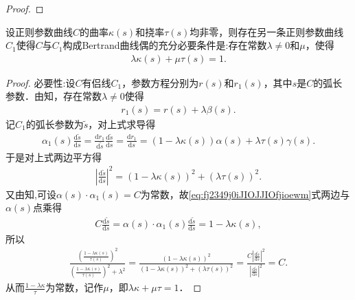 \documentclass[../../main.tex]{subfiles}%
\begin{document}
\begin{proof}
\end{proof}

\begin{theorem}\label{theorem:微分几何-定理7.2}
设正则参数曲线$C$的曲率$\kappa(s)$和挠率$\tau(s)$均非零，则存在另一条正则参数曲线$C_1$使得$C$与$C_1$构成Bertrand曲线偶的充分必要条件是:存在常数$\lambda\neq0$和$\mu$，使得
\begin{align*}
\lambda\kappa(s)+\mu\tau(s)=1.
\end{align*}
\end{theorem}
\begin{proof}

{\heiti 必要性:}设$C$有侣线$C_1$，参数方程分别为$r(s)$和$r_1(s)$，其中$s$是$C$的弧长参数．由知，存在常数$\lambda\neq0$使得
\begin{align*}
r_1(s)=r(s)+\lambda\beta(s).
\end{align*}
记$C_1$的弧长参数为$\tilde{s}$，对上式求导得
\begin{align}\label{eq:fj2349j0iJIOJJIOfjioewm}
\alpha _1\left( s \right) \frac{\mathrm{d}\tilde{s}}{\mathrm{d}s}=\frac{\mathrm{d}r_1}{\mathrm{d}\tilde{s}}\frac{\mathrm{d}\tilde{s}}{\mathrm{d}s}=\frac{\mathrm{d}r_1}{\mathrm{d}s}=\left( 1-\lambda \kappa \left( s \right) \right) \alpha \left( s \right) +\lambda \tau \left( s \right) \gamma \left( s \right) .
\end{align}
于是对上式两边平方得
\begin{align*}
\left| \frac{\mathrm{d}\tilde{s}}{\mathrm{d}s} \right|^2=\left( 1-\lambda \kappa \left( s \right) \right) ^2+\left( \lambda \tau \left( s \right) \right) ^2.
\end{align*}
又由知,可设$\alpha(s)\cdot\alpha_1(s)=C$为常数，故\eqref{eq:fj2349j0iJIOJJIOfjioewm}式两边与$\alpha(s)$点乘得
\begin{align*}
C\frac{\mathrm{d}\tilde{s}}{\mathrm{d}s}=\alpha \left( s \right) \cdot \alpha _1\left( s \right) \frac{\mathrm{d}\tilde{s}}{\mathrm{d}s}=1-\lambda \kappa \left( s \right) ,
\end{align*}
所以
\begin{align*}
\frac{\left( \frac{1-\lambda \kappa \left( s \right)}{\tau \left( s \right)} \right) ^2}{\left( \frac{1-\lambda \kappa \left( s \right)}{\tau \left( s \right)} \right) ^2+\lambda ^2}=\frac{\left( 1-\lambda \kappa \left( s \right) \right) ^2}{\left( 1-\lambda \kappa \left( s \right) \right) ^2+\left( \lambda \tau \left( s \right) \right) ^2}=\frac{C\left| \frac{\mathrm{d}\widetilde{s}}{\mathrm{d}s} \right|^2}{\left| \frac{\mathrm{d}\widetilde{s}}{\mathrm{d}s} \right|^2}=C.
\end{align*}
从而$\frac{1-\lambda\kappa}{\tau}$为常数，记作$\mu$，即$\lambda\kappa+\mu\tau=1$．


\end{proof}
\end{document}
